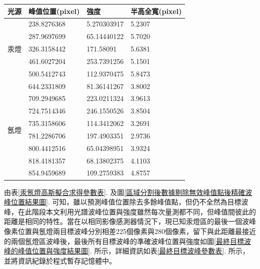 \begin{center}
	\vspace{0.8cm}
	\label{汞氬燈高斯擬合求得參數表}
\begin{tabularx}{\textwidth}{m{}<{\centering}m{}<{\centering}m{}<{\centering}m{}<{\centering}}
	\hline\hline
	光源            & 峰值位置(pixel) & 強度 & 半高全寬(pixel) \\
	\hline
	\multirow{5}{*}{汞燈 }
	&238.8276368&    5.270303917& 5.2307\\
	&287.9697699&	65.14440122& 5.7020\\
	&326.3158442&	171.58091  & 5.6381\\
	&461.6027204&	253.7391256& 5.1501\\
	&500.5412743&	112.9370475& 5.8473\\
	\hline
	\multirow{8}{*}{氬燈 }
	&644.2331809&	81.36141267& 3.8002\\
	&709.2949685&	223.0211324& 3.9613\\
	&724.7514346&	246.1550526& 3.8504\\
	&735.3158606&	114.3412062& 3.2691\\
	&781.2286706&	197.4903351& 2.9736\\
	&800.4412516&	65.04398951& 3.9324\\
	&818.4181357&	68.13802375& 4.1103\\
	&854.9459689&	109.2759383& 4.8757\\                     
	\hline\hline
\end{tabularx}
\vspace{10pt}
\end{center}
\par 
由表\ref{汞氬燈高斯擬合求得參數表}. 及圖\ref{區域分割後數據剔除無效峰值點後精確波峰位置結果圖}. 可知，雖以預測峰值位置除去多餘峰值點，但仍不全然為目標波峰，在此階段本文利用光譜波峰位置與強度雖然每次量測都不同，但峰值間彼此的距離是相同的特性。當在以相同影像感測器情況下，現已知汞燈區的最後一個波峰像素位置與氬燈兩目標波峰分別相差225個像素與280個像素，留下與此距離最接近的兩個氬燈區波峰後，最後所有目標波峰的準確波峰位置與強度如圖\ref{最終目標波峰的峰值位置與強度結果圖}. 所示，詳細資訊如表\ref{最終目標波峰參數表}. 所示，並將資訊紀錄於程式暫存記憶體中。
